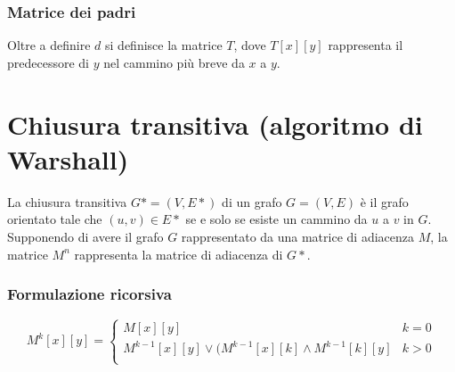 \subsubsection{Matrice dei padri}
Oltre a definire $d$ si definisce la matrice $T$, dove $T[x][y]$ rappresenta il predecessore di $y$ nel cammino pi\`u breve da $x$ a $y$.\\

\section{Chiusura transitiva (algoritmo di Warshall)}
La chiusura transitiva $G* = (V, E*)$ di un grafo $G = (V, E)$ \`e il grafo orientato tale che $(u, v)\in E*$ se e solo se esiste un cammino da $u$ a $v$ in $G$. Supponendo di avere il
grafo $G$ rappresentato da una matrice di adiacenza $M$, la matrice $M^n$ rappresenta la matrice di adiacenza di $G*$.
\subsubsection{Formulazione ricorsiva}
$$M^k[x][y] = \begin{cases}
	M[x][y] & k = 0\\
	M^{k-1}[x][y]\lor (M^{k-1}[x][k]\land M^{k-1}[k][y] & k>0\\
\end{cases}$$
